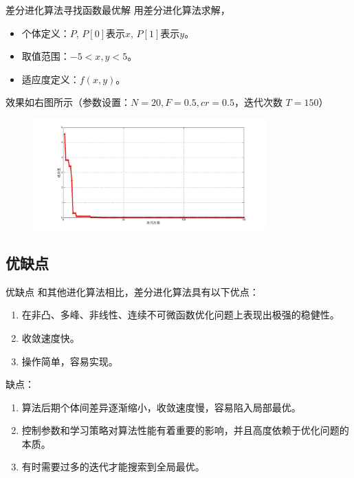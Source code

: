 \begin{frame}{差分进化算法寻找函数最优解}
	用差分进化算法求解，
	\begin{itemize}
		\item 个体定义：$P$, $P[0]$表示$x$, $P[1]$表示$y$。
		\item 取值范围：$-5 < x, y < 5$。
		\item 适应度定义：$f(x,y)$。
	\end{itemize}
	效果如右图所示（参数设置：$N=20, F=0.5, cr=0.5$，迭代次数 $T=150$）
	\begin{figure}
		\includegraphics [width =0.8\textwidth]{../images/curve.png}
	\end{figure}
\end{frame}

\subsection{优缺点}
\begin{frame}{优缺点}
和其他进化算法相比，差分进化算法具有以下优点：
	\begin{enumerate}
		\item 在非凸、多峰、非线性、连续不可微函数优化问题上表现出极强的稳健性。
		\item 收敛速度快。
		\item 操作简单，容易实现。
	\end{enumerate}
	缺点：
	\begin{enumerate}
		\item 算法后期个体间差异逐渐缩小，收敛速度慢，容易陷入局部最优。
		\item 控制参数和学习策略对算法性能有着重要的影响，并且高度依赖于优化问题的本质。
		\item 有时需要过多的迭代才能搜索到全局最优。
	\end{enumerate}
\end{frame}


